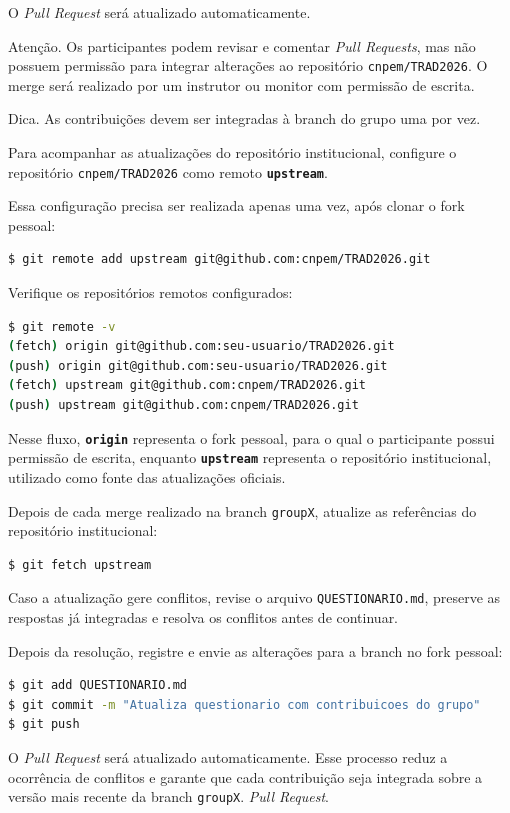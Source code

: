 \documentclass[12pt,a4paper]{article}
\begin{document}
O \textit{Pull Request} será atualizado automaticamente.

\begin{question}{Atenção.}
\footnotesize Os participantes podem revisar e comentar \textit{Pull Requests}, mas não possuem permissão para integrar alterações ao repositório \texttt{cnpem/TRAD2026}. O merge será realizado por um instrutor ou monitor com permissão de escrita.
\end{question}

\begin{question}{Dica.}
\footnotesize 
As contribuições devem ser integradas à branch do grupo uma por vez.

Para acompanhar as atualizações do repositório institucional, configure o repositório \texttt{cnpem/TRAD2026} como remoto \textbf{\texttt{upstream}}.

Essa configuração precisa ser realizada apenas uma vez, após clonar o fork pessoal:

\begin{lstlisting}[language=bash]
$ git remote add upstream git@github.com:cnpem/TRAD2026.git
\end{lstlisting}

Verifique os repositórios remotos configurados:

\begin{lstlisting}[language=bash]
$ git remote -v 
(fetch) origin git@github.com:seu-usuario/TRAD2026.git
(push) origin git@github.com:seu-usuario/TRAD2026.git
(fetch) upstream git@github.com:cnpem/TRAD2026.git
(push) upstream git@github.com:cnpem/TRAD2026.git 
\end{lstlisting}

Nesse fluxo, \textbf{\texttt{origin}} representa o fork pessoal, para o qual o participante possui permissão de escrita, enquanto \textbf{\texttt{upstream}} representa o repositório institucional, utilizado como fonte das atualizações oficiais.

Depois de cada merge realizado na branch \texttt{groupX}, atualize as referências do repositório institucional:

\begin{lstlisting}[language=bash]
$ git fetch upstream
\end{lstlisting}

Caso a atualização gere conflitos, revise o arquivo \texttt{QUESTIONARIO.md}, preserve as respostas já integradas e resolva os conflitos antes de continuar.

Depois da resolução, registre e envie as alterações para a branch no fork pessoal:

\begin{lstlisting}[language=bash]
$ git add QUESTIONARIO.md
$ git commit -m "Atualiza questionario com contribuicoes do grupo"
$ git push
\end{lstlisting}

O \textit{Pull Request} será atualizado automaticamente. Esse processo reduz a ocorrência de conflitos e garante que cada contribuição seja integrada sobre a versão mais recente da branch \texttt{groupX}.
\textit{Pull Request}.
\end{question}
\end{document}
